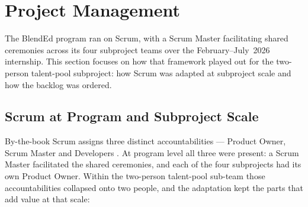 
\section{Project Management}
\label{sec:analysis-pm}

The BlendEd program ran on Scrum, with a Scrum Master facilitating shared
ceremonies across its four subproject teams over the February--July~2026
internship. This section focuses on how that framework played out for the
two-person talent-pool subproject: how Scrum was adapted at subproject scale
and how the backlog was ordered.

\subsection{Scrum at Program and Subproject Scale}
\label{sec:method-scrum}

By-the-book Scrum assigns three distinct accountabilities --- Product Owner,
Scrum Master and Developers \parencite{ScrumGuide2020,SchwaberBeedle2002}. At
program level all three were present: a Scrum
Master facilitated the shared ceremonies, and each of the four subprojects
had its own Product Owner. Within the two-person talent-pool sub-team those
accountabilities collapsed onto two people, and the adaptation kept the parts
that add value at that scale:

